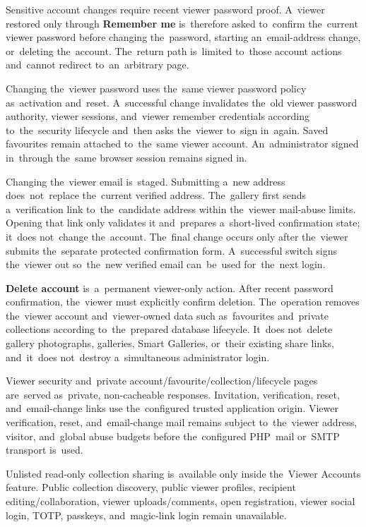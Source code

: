\documentclass[11pt,a4paper]{article}
\newcommand{\ui}[1]{\textbf{#1}}
\begin{document}
Sensitive account changes require recent viewer password proof. A~viewer
restored only through \ui{Remember me} is~therefore asked to~confirm the~current
viewer password before changing the~password, starting an~email-address change,
or~deleting the~account. The~return path is~limited to~those account actions
and~cannot redirect to~an~arbitrary page.

Changing the~viewer password uses the~same viewer password policy as~activation
and~reset. A~successful change invalidates the~old viewer password authority,
viewer sessions, and~viewer remember credentials according to~the~security
lifecycle and~then asks the~viewer to~sign in~again. Saved favourites remain
attached to~the~same viewer account. An~administrator signed in~through the~same
browser session remains signed in.

Changing the~viewer email is~staged. Submitting a~new address does~not~replace
the~current verified address. The~gallery first sends a~verification link
to~the~candidate address within the~viewer mail-abuse limits. Opening that link
only validates it and~prepares a~short-lived confirmation state; it~does
not~change the~account. The~final change occurs only after the~viewer submits
the~separate protected confirmation form. A~successful switch signs the~viewer
out so~the~new verified email can~be~used for~the~next login.

\ui{Delete account} is~a~permanent viewer-only action. After recent password
confirmation, the~viewer must explicitly confirm deletion. The~operation removes
the~viewer account and~viewer-owned data such as~favourites and~private
collections according to~the~prepared database lifecycle. It~does not~delete
gallery photographs, galleries, Smart Galleries, or~their existing share links,
and~it~does not~destroy a~simultaneous administrator login.

Viewer security and~private account/favourite/collection/lifecycle pages
are~served as~private, non-cacheable responses. Invitation, verification, reset,
and~email-change links use the~configured trusted application origin. Viewer
verification, reset, and~email-change mail remains subject to~the~viewer
address, visitor, and~global abuse budgets before the~configured PHP~mail
or~SMTP transport is~used.

Unlisted read-only collection sharing is~available only inside the~Viewer
Accounts feature. Public collection discovery, public viewer profiles, recipient
editing/collaboration, viewer uploads/comments, open registration, viewer social
login, TOTP, passkeys, and~magic-link login remain unavailable.
\end{document}
